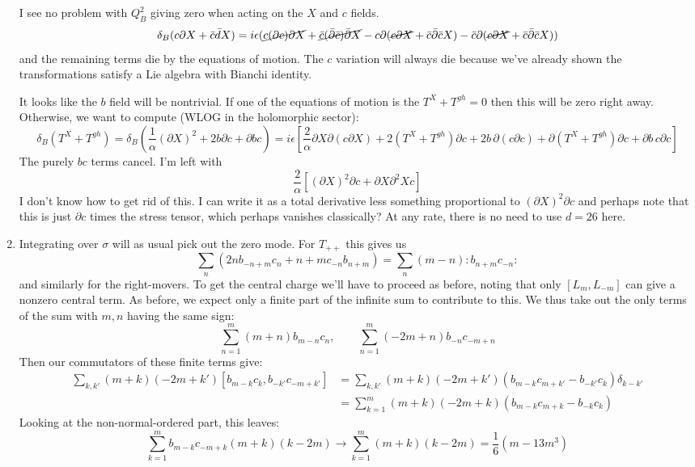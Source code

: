 \documentclass[11pt, class=article, crop=false]{standalone}
\begin{document}
\begin{enumerate}
	  I see no problem with $Q^2_B$ giving zero when acting on the $X$ and $c$ fields.
	  \[
	  	\delta_B (c \partial X+ \bar c \bar d X ) = i \epsilon (\cancel {c (\partial c) \partial X} + \cancel{\bar c (\bar {\partial} \bar c) \bar {\partial} X} - c \partial (\cancel{c \partial X} + \bar c \bar {\partial} \bar c X) -  \bar c \partial (\cancel{c \partial X} + \bar c \bar {\partial} \bar c X) )
	  \]
	  and the remaining terms die by the equations of motion. The $c$ variation will always die because we've already shown the transformations satisfy a Lie algebra with Bianchi identity. 
	  
	  It looks like the $b$ field will be nontrivial. If one of the equations of motion is the $T^X + T^{gh} = 0$ then this will be zero right away. Otherwise, we want to compute (WLOG in the holomorphic sector):
	  	  \[
	  	  	\delta_B (T^X + T^{gh}) = \delta_B (\frac1\alpha (\partial X)^2 + 2 b \partial c + \partial b c) = i \epsilon [\frac2\alpha \partial X \partial(c \partial X) + 2 (T^X + T^{gh}) \partial c + 2 b\, \partial(c \partial c) + \partial(T^X + T^{gh}) \partial c + \partial b\, c \partial c ] 
	  	  \]
		  The purely $b c$ terms cancel. I'm left with
		  \[
		  	\frac2\alpha [(\partial X)^2 \partial c + \partial X \partial^2 X c]
		  \]
		  I don't know how to get rid of this. I can write it as a total derivative less something proportional to $(\partial X)^2 \partial c$ and perhaps note that this is just $\partial c$ times the stress tensor, which perhaps vanishes classically? At any rate, there is no need to use $d=26$ here.
	  
	  \item Integrating over $\sigma$ will as usual pick out the zero mode. For $T_{++}$ this gives us
	  \[
	  	\sum_n (2 n b_{-n+m} c_n + n+m c_{-n} b_{n+m}) = \sum_n (m-n) :b_{n+m} c_{-n}:
	  \]
	  and similarly for the right-movers. To get the central charge we'll have to proceed as before, noting that only $[L_m, L_{-m}]$ can give a nonzero central term. As before, we expect only a finite part of the infinite sum to contribute to this. We thus take out the only terms of the sum with $m,n$ having the same sign:
	  \[
	  	\sum_{n=1}^m (m+n) b_{m-n} c_n , \qquad \sum_{n=1}^m (-2m+n) b_{-n} c_{-m+n}
	  \]
	  Then our commutators of these finite terms give:
	  \[
	  \begin{aligned}
	  		  	\sum_{k, k'} (m+k) (-2m + k') [b_{m-k} c_k, b_{-k'} c_{-m+k'}]
				&= \sum_{k, k'} (m+k) (-2m + k') (b_{m-k} c_{m+k'}  - b_{-k'} c_{k}) \delta_{k - k'}\\
				& = \sum_{k=1}^m (m+k) (-2m +k)(b_{m-k} c_{m+k} - b_{-k} c_k)
	  \end{aligned}
	  \]
	  Looking at the non-normal-ordered part, this leaves:
	  \[
	  	\sum_{k=1}^m b_{m-k} c_{-m+k} (m+k) (k-2m) \to \sum_{k=1}^m (m+k)(k-2m) = \frac{1}{6} (m - 13m^3)
	  \]
	  

\end{enumerate}
\end{document}
